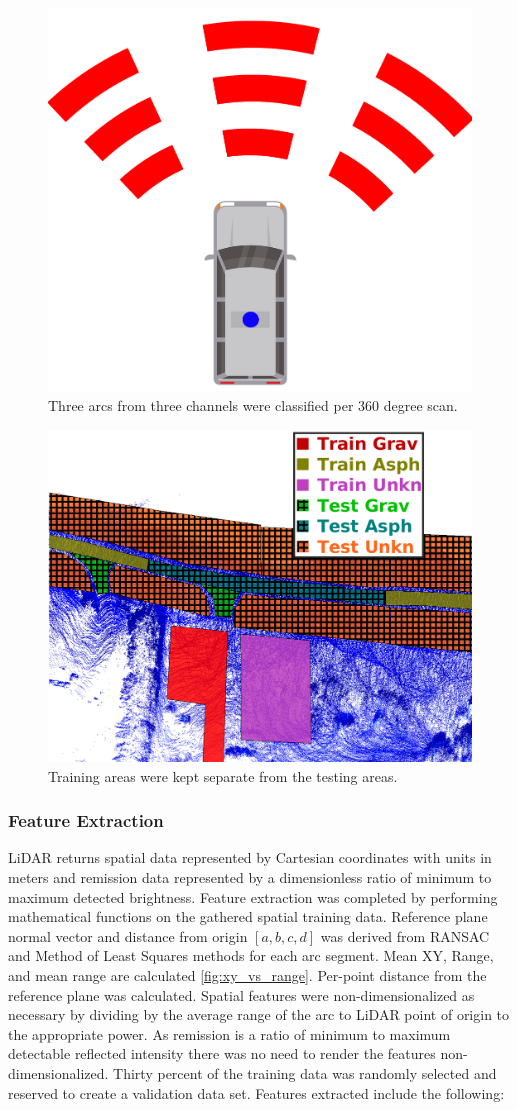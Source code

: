 \documentclass[numbered,pdftex]{ohio-etd}
\begin{document}
{{{{				\begin{figure}[H]
					\centering
					\includegraphics[width=0.25\linewidth]{Defense_Images/area_example}
					\caption[Areas to Classify]{Three arcs from three channels were classified per 360 degree scan. }
					\label{fig:area_example}
				\end{figure}
				
				\begin{figure}[H]
					\centering
					\includegraphics[width=0.75\linewidth]{Defense_Images/test_vs_train_areas_hatch}
					\caption[Training vs Testing Areas]{Training areas were kept separate from the testing areas.}
					\label{fig:test_vs_train_areas}
				\end{figure}
			
			} %
		
		\newpage
			
			\subsubsection{Feature Extraction}\label{sec:Feat_Extract} {
			
				{LiDAR returns spatial data represented by Cartesian coordinates with units in meters and remission data represented by a dimensionless ratio of minimum to maximum detected brightness. Feature extraction was completed by performing mathematical functions on the gathered spatial training data. Reference plane normal vector and distance from origin $[a,b,c,d]$ was derived from RANSAC and Method of Least Squares methods for each arc segment. Mean XY, Range, and mean range are calculated \ref{fig:xy_vs_range}. Per-point distance from the reference plane was calculated. Spatial features were non-dimensionalized as necessary by dividing by the average range of the arc to LiDAR point of origin to the appropriate power. As remission is a ratio of minimum to maximum detectable reflected intensity there was no need to render the features non-dimensionalized. Thirty percent of the training data was randomly selected and reserved to create a validation data set. Features extracted include the following:}
				
}}}}
\end{document}
